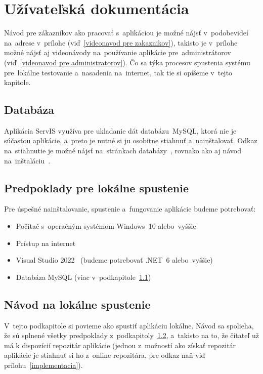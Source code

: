 \chapter{Užívateľská dokumentácia}

Návod pre zákazníkov ako pracovať s~aplikáciou je možné nájsť v~podobe\linebreak videí na~adrese v~prílohe (viď~\ref{videonavod pre zakaznikov}), takisto je v~prílohe možné nájsť aj videonávody na~používanie aplikácie pre~administrátorov (viď~\ref{videonavod pre administratorov}). Čo sa týka procesov spustenia systému pre~lokálne testovanie a~nasadenia na~internet, tak tie si opíšeme v~tejto kapitole.

\section{Databáza}
\label{databaza}

Aplikácia ServIS využíva pre ukladanie dát databázu~MySQL, ktorá nie je súčasťou aplikácie, a~preto je nutné si ju osobitne stiahnuť a~nainštalovať. Odkaz na~stiahnutie je možné nájsť na~stránkach databázy~\cite{mysql}, rovnako ako aj návod na~inštaláciu~\cite{mysql navod}.

\section{Predpoklady pre lokálne spustenie}
\label{predpoklady}

Pre úspešné nainštalovanie, spustenie a~fungovanie aplikácie budeme potrebovať:

\begin{itemize}
\item Počítač s~operačným systémom Windows~10 alebo~vyššie
\item Prístup na internet
\item Visual Studio 2022~\cite{visual studio} (budeme potrebovať .NET~6 alebo~vyššie)
\item Databáza MySQL (viac v~podkapitole~\ref{databaza})
\end{itemize}

\section{Návod na lokálne spustenie}
\label{navod}

V~tejto podkapitole si povieme ako spustiť aplikáciu lokálne. Návod sa spolieha, že sú splnené všetky predpoklady z~podkapitoly~\ref{predpoklady}, a~takisto na to, že čítateľ už má k dispozícií repozitár aplikácie (jednou z~možností ako získať repozitár aplikácie je stiahnuť si ho z~online repozitára, pre odkaz naň viď prílohu~\ref{implementacia}).

